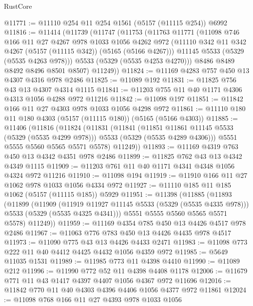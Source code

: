 \begin{lexlean}{RustCore}
\begin{coremodule}
@11771 := @11110 @254 @11 @254 @1561 (@5157 (@11115 @254)) @6992
@11816 := @11414
    (@11739
      (@11747
        (@11753
          (@11763
            @11771
            (@11098
              @746
              @166
              @11
              @27
              @4267
              @978
              @1033
              @1056
              @4262
              @972
              (@11110 @342 @11 @342 @4267 (@5157 (@11115 @342)) (@5165 (@5166 @4267)))
              @11145
              @5533
              (@5329 (@5535 @4263 @978)))
            @5533
            (@5329 (@5535 @4253 @4270)))
          @8486
          @8489
          @8492
          @8496
          @8501
          @8507)
        @11249))
@11824 := @11169 @4283 @757 @450 @13 @4307 @4316 @978 @2486
@11825 := @11089 @192
@11831 := @11825 @756 @43 @13 @4307 @4314 @1115
@11841 := @11203 @755 @11 @40 @1171 @4306 @4313 @1056 @4288 @972 @11216
@11842 := @11098 @197
@11851 := @11842 @166 @11 @27 @4303 @978 @1033 @1056 @4298 @972
@11861 := @11110 @180 @11 @180 @4303 (@5157 (@11115 @180)) (@5165 (@5166 @4303))
@11885 := @11406
    (@11816
      (@11824
        (@11831
          (@11841
            (@11851 @11861 @11145 @5533 (@5329 (@5535 @4299 @978)))
            @5533
            (@5329 (@5535 @4289 @4306)))
          @5551
          @5555
          @5560
          @5565
          @5571
          @5578)
        @11249))
@11893 := @11169 @4319 @763 @450 @13 @4342 @4351 @978 @2486
@11899 := @11825 @762 @43 @13 @4342 @4349 @1115
@11909 := @11203 @761 @11 @40 @1171 @4341 @4348 @1056 @4324 @972 @11216
@11910 := @11098 @194
@11919 := @11910 @166 @11 @27 @1062 @978 @1033 @1056 @4334 @972
@11927 := @11110 @185 @11 @185 @1062 (@5157 (@11115 @185)) @5929
@11951 := @11398
    (@11885
      (@11893
        (@11899
          (@11909
            (@11919 @11927 @11145 @5533 (@5329 (@5535 @4335 @978)))
            @5533
            (@5329 (@5535 @4325 @4341)))
          @5551
          @5555
          @5560
          @5565
          @5571
          @5578)
        @11249))
@11959 := @11169 @4354 @785 @450 @13 @4426 @4517 @978 @2486
@11967 := @11063 @776 @783 @450 @13 @4426 @4435 @978 @4517
@11973 := @11090 @775 @43 @13 @4426 @4433 @2471
@11983 := @11098 @773 @222 @11 @40 @4412 @4425 @4432 @1056 @4359 @972
@11985 := @5649 @11035 @1531
@11989 := @11985 @773 @11 @4398 @4410
@11990 := @11089 @212
@11996 := @11990 @772 @52 @11 @4398 @4408 @1178
@12006 := @11679 @771 @11 @43 @1417 @4397 @4407 @1056 @4367 @972 @11696
@12016 := @11842 @770 @11 @40 @4303 @4396 @4406 @1056 @4377 @972 @11861
@12024 := @11098 @768 @166 @11 @27 @4393 @978 @1033 @1056

\end{coremodule}
\end{lexlean}
